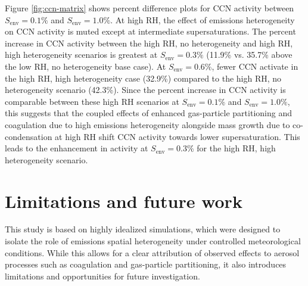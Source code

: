 \documentclass[acp, manuscript]{copernicus}
\begin{document}
Figure \ref{fig:ccn-matrix} shows percent difference plots for CCN activity between $S_{\mathrm{env}}=0.1\%$ and $S_{\mathrm{env}}=1.0\%$. At high RH, the effect of emissions heterogeneity on CCN activity is muted except at intermediate supersaturations. The percent increase in CCN activity between the high RH, no heterogeneity and high RH, high heterogeneity scenarios is greatest at $S_{\mathrm{env}}=0.3\%$ (11.9\% vs. 35.7\% above the low RH, no heterogeneity base case). At $S_{\mathrm{env}}=0.6\%$, fewer CCN activate in the high RH, high heterogeneity case (32.9\%) compared to the high RH, no heterogeneity scenario (42.3\%). Since the percent increase in CCN activity is comparable between these high RH scenarios at $S_{\mathrm{env}}=0.1\%$ and $S_{\mathrm{env}}=1.0\%$, this suggests that the coupled effects of enhanced gas-particle partitioning and coagulation due to high emissions heterogeneity alongside mass growth due to co-condensation at high RH shift CCN activity towards lower supersaturation. This leads to the enhancement in activity at $S_{\mathrm{env}}=0.3\%$ for the high RH, high heterogeneity scenario. 


\section{Limitations and future work}\label{sec:limitations}
This study is based on highly idealized simulations,
which were designed to isolate the role of emissions spatial
heterogeneity under controlled meteorological conditions. While this
allows for a clear attribution of observed effects to aerosol
processes such as coagulation and gas-particle partitioning, it also
introduces limitations and opportunities for future investigation.
\end{document}
